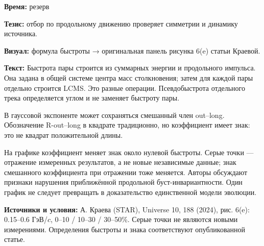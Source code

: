\textbf{Время:} резерв

\textbf{Тезис:} отбор по продольному движению проверяет симметрии и динамику источника.

\textbf{Визуал:} формула быстроты → оригинальная панель рисунка 6(e) статьи Краевой.

\textbf{Текст:} Быстрота пары строится из суммарных энергии и продольного импульса. Она задана в общей системе центра масс столкновения; затем для каждой пары отдельно строится LCMS. Это разные операции. Псевдобыстрота отдельного трека определяется углом и не заменяет быстроту пары.

В гауссовой экспоненте может сохраняться смешанный член out–long. Обозначение R-out–long в квадрате традиционно, но коэффициент имеет знак: это не квадрат положительной длины.

На графике коэффициент меняет знак около нулевой быстроты. Серые точки — отражение измеренных результатов, а не новые независимые данные; знак смешанного коэффициента при отражении тоже меняется. Авторы обсуждают признаки нарушения приближённой продольной буст-инвариантности. Один график не следует превращать в доказательство единственной модели эволюции.

\textbf{Источники и условия:} А. Краева (STAR), Universe 10, 188 (2024), рис. 6(e): 0.15–0.6 ГэВ/\(c\), 0–10 / 10–30 / 30–50\%. Серые точки не являются новыми измерениями. Определения быстроты и знака соответствуют опубликованной статье.
